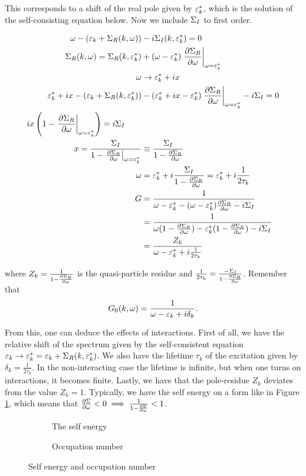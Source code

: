 This corresponds to a shift of the real pole given by $\varepsilon_k^*$, which is the solution of the self-consisting equation below. Now we include $\Sigma_I$ to first order.

\begin{align*}
    \omega - (\ep_k + \s_R(k,\omega)) &- i\s_I(k,\ep_k^*) = 0 \\
    \s_R(k, \omega) = \s_R(k, \ep_k^*) &+ (\omega - \ep_k^*)\eval{\pdv{\s_R}{\omega}}_{\omega = \ep_k^*} \\ 
    \omega &\to \ep_k^* + ix \\ 
    \ep_k^* + ix - (\ep_k + \s_R(k,\ep_k^*)) &- (\ep_k^* + ix - \ep_k^*)\eval{\pdv{\s_R}{\omega}}_{\omega = \ep_k^*} -i\s_I = 0 \\ 
    ix\left(1 - \eval{\pdv{\s_R}{\omega}}_{\omega = \ep_k^*}\right) = i\s_I \quad \quad \\
    x = \frac{\s_I}{1 - \eval{\pdv{\s_R}{\omega}}_{\omega = \ep_k^*}} &\equiv \frac{\s_I}{1 - \pdv{\s_R}{\omega}} \\ 
    \omega &= \ep_k^* + i \frac{\s_I}{1 - \pdv{\s_R}{\omega}} = \ep_k^* + i\frac{1}{2\tau_k} \\
    G &= \frac{1}{\omega - \ep_k^* - (\omega - \ep_k^*)\pdv{\s_R}{\omega} - i\s_I} \\ 
    &= \frac{1}{\omega(1- \pdv{\s_R}{\omega}) - \ep_k^*(1 - \pdv{\s_R}{\omega}) - i\s_I} \\ 
    &= \frac{Z_k}{\omega - \ep_k^* +i\frac{1}{2\tau_k}}
\end{align*}

where $Z_k = \frac{1}{1 - \pdv{\Sigma_R}{\omega}}$ is the quasi-particle residue and $\frac{1}{2\tau_k} = \frac{-\Sigma_I}{1 - \pdv{\Sigma_R}{\omega}}$. Remember that \\ 

\begin{align*}
    G_0(k, \omega) = \frac{1}{\omega - \varepsilon_k + i \delta_k}. 
\end{align*}

From this, one can deduce the effects of interactions.  First of all, we have the relative shift of the spectrum given by the self-consistent equation $\varepsilon_k \to \varepsilon^*_k = \varepsilon_k + \Sigma_R(k, \varepsilon^*_k)$. We also have the lifetime $\tau_k$ of the excitation given by $\delta_k = \frac{1}{2\tau_k}$. In the non-interacting case the lifetime is infinite, but when one turns on interactions, it becomes finite. Lastly, we have that the pole-residue $Z_k$ deviates from the value $Z_k = 1$. Typically, we have the self energy on a form like in Figure \ref{fig:self_e}, which means that $\pdv{\Sigma}{\omega} < 0 \implies \frac{1}{1 - \pdv{\Sigma}{\omega}} < 1$. 
\begin{figure}
	\centering
	\begin{subfigure}{0.4\textwidth}    
    
	\caption{The self energy}
	\label{fig:self_e}
	\end{subfigure}
	\hfill
	\begin{subfigure}{0.4\textwidth}
	
	\caption{Occupation number}		
	\end{subfigure}
	\caption{Self energy and occupation number}
\end{figure}


